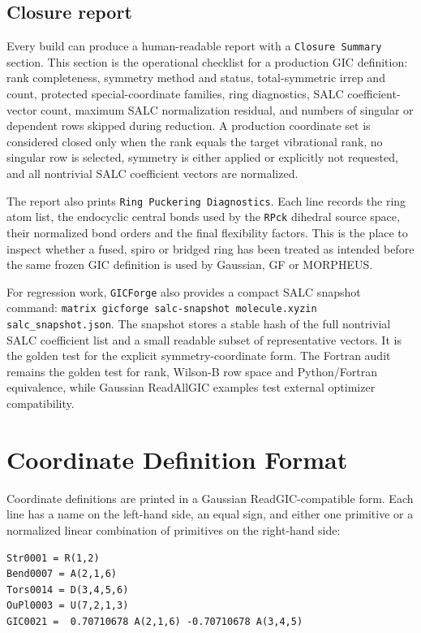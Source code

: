 \documentclass[11pt]{article}
\newcommand{\program}{\texttt{GICForge}}
\begin{document}
\subsection{Closure report}

Every build can produce a human-readable report with a \texttt{Closure Summary}
section.  This section is the operational checklist for a production GIC
definition: rank completeness, symmetry method and status, total-symmetric
irrep and count, protected special-coordinate families, ring diagnostics, SALC
coefficient-vector count, maximum SALC normalization residual, and numbers of
singular or dependent rows skipped during reduction.  A production coordinate
set is considered closed only when the rank equals the target vibrational rank,
no singular row is selected, symmetry is either applied or explicitly not
requested, and all nontrivial SALC coefficient vectors are normalized.

The report also prints \texttt{Ring Puckering Diagnostics}.  Each line records
the ring atom list, the endocyclic central bonds used by the \texttt{RPck}
dihedral source space, their normalized bond orders and the final flexibility
factors.  This is the place to inspect whether a fused, spiro or bridged ring
has been treated as intended before the same frozen GIC definition is used by
Gaussian, GF or MORPHEUS.

For regression work, \program{} also provides a compact SALC snapshot command:
\texttt{matrix gicforge salc-snapshot molecule.xyzin salc\_snapshot.json}.  The
snapshot stores a stable hash of the full nontrivial SALC coefficient list and
a small readable subset of representative vectors.  It is the golden test for
the explicit symmetry-coordinate form.  The Fortran audit remains the golden
test for rank, Wilson-B row space and Python/Fortran equivalence, while
Gaussian ReadAllGIC examples test external optimizer compatibility.

\section{Coordinate Definition Format}

Coordinate definitions are printed in a Gaussian ReadGIC-compatible form.  Each
line has a name on the left-hand side, an equal sign, and either one primitive
or a normalized linear combination of primitives on the right-hand side:

\begin{lstlisting}[style=oracle]
Str0001 = R(1,2)
Bend0007 = A(2,1,6)
Tors0014 = D(3,4,5,6)
OuPl0003 = U(7,2,1,3)
GIC0021 =  0.70710678 A(2,1,6) -0.70710678 A(3,4,5)
\end{lstlisting}
\end{document}
